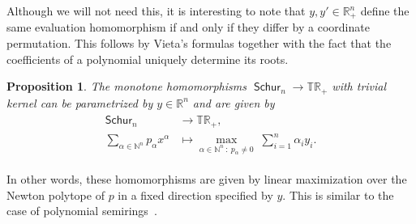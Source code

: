 \documentclass[11pt]{article}
\newtheorem{prop}[theo]{Proposition}
\theoremstyle{definition}
\numberwithin{equation}{section}
\newcommand{\N}{\mathbb{N}}
\newcommand{\R}{\mathbb{R}}
\newcommand{\TR}{\mathbb{TR}}
\DeclareMathOperator{\Schur}{\mathsf{Schur}}
\begin{document}
Although we will not need this, it is interesting to note that $y, y' \in \R_+^n$ define the same evaluation homomorphism if and only if they differ by a coordinate permutation.
This follows by Vieta's formulas together with the fact that the coefficients of a polynomial uniquely determine its roots.

\begin{prop}
	\label{trop_schur}
	The monotone homomorphisms $\Schur_n \to \TR_+$ with trivial kernel can be parametrized by $y \in \R^n$ and are given by \smallskip
	\begin{align}
		\begin{split}
			\label{trop_schur_eq}
			\Schur_n & \longrightarrow \TR_+, \\
			\sum_{\alpha \in \N^n} p_\alpha x^\alpha & \longmapsto \max_{\alpha \in \N^n \::\: p_\alpha \neq 0} \; \sum_{i=1}^n \alpha_i y_i.
		\end{split}
	\end{align}
\end{prop}

In other words, these homomorphisms are given by linear maximization over the Newton polytope of $p$ in a fixed direction specified by $y$.
This is similar to the case of polynomial semirings~\cite[Example~2.9]{vergleichsstellensatz}.
\end{document}
